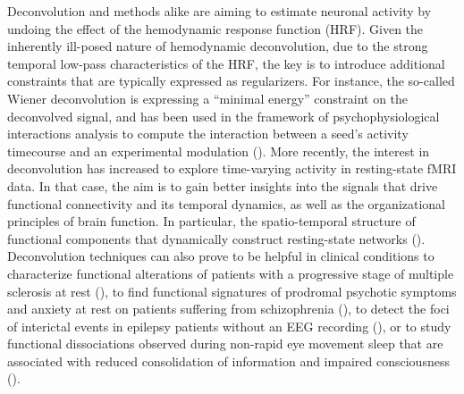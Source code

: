 Deconvolution and methods alike are aiming to estimate neuronal activity by undoing the effect of the hemodynamic response function (HRF). Given the inherently ill-posed nature of hemodynamic deconvolution, due to the strong temporal low-pass characteristics of the HRF, the key is to introduce additional constraints that are typically expressed as regularizers. For instance, the so-called Wiener deconvolution is expressing a ``minimal energy'' constraint on the deconvolved signal, and has been used in the framework of psychophysiological interactions analysis to compute the interaction between a seed's activity timecourse and an experimental modulation (\citealt{glover1999deconvolution,gitelman2003ModelingRegionalPsychophysiologic}). More recently, the interest in deconvolution has increased to explore time-varying activity in resting-state fMRI data. In that case, the aim is to gain better insights into the signals that drive functional connectivity and its temporal dynamics, as well as the organizational principles of brain function. In particular,  the spatio-temporal structure of functional components that dynamically construct resting-state networks (\citealt{petridou2013PeriodsRestFMRI,karahanoglu2015TransientBrainActivity,karahanoglu2017DynamicsLargescaleFMRI,kinany2020DynamicFunctionalConnectivity, gonzalez-castillo2019ImagingSpontaneousFlow,allan2015FunctionalConnectivityMRI}). Deconvolution techniques can also prove to be helpful in clinical conditions to characterize functional alterations of patients with a progressive stage of multiple sclerosis at rest (\citealt{bommarito2020FunctionalNetworkDynamicsa}), to find functional signatures of prodromal psychotic symptoms and anxiety at rest on patients suffering from schizophrenia (\citealt{zoller2019LargeScaleBrainNetwork}), to detect the foci of interictal events in epilepsy patients without an EEG recording (\citealt{lopes2012DetectionEpilepticActivity}), or to study functional dissociations observed during non-rapid eye movement sleep that are associated with reduced consolidation of information and impaired consciousness (\citealt{tarun2021NREMSleepStagesa}).

